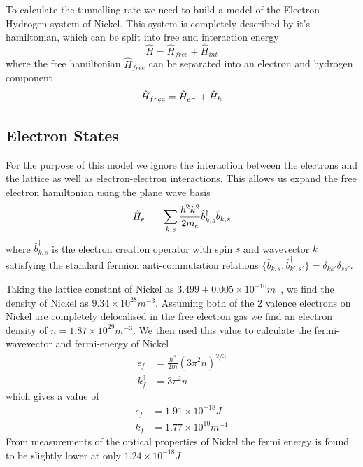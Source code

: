 To calculate the tunnelling rate we
need to build a model of the Electron-Hydrogen
system of Nickel. This system is completely
described by it's hamiltonian, which can be
split into free and interaction energy
\begin{equation}
  \hat{H} = \hat{H}_{free} + \hat{H}_{int}
\end{equation}
where the free hamiltonian \(\hat{H}_{free}\)
can be separated
into an electron and hydrogen component
\begin{equation}
  \hat{H}_{free} =
  \hat{H}_{e^-} + \hat{H}_{h}\\
\end{equation}



\subsection{Electron States}\label{sec:electron states}
For the purpose of this model we ignore the
interaction between the electrons
and the lattice as well as electron-electron
interactions. This allows
us expand the free electron
hamiltonian using the plane wave
basis
\begin{equation}
  \hat{H}_{e^-} = \sum_{k, s}
  \frac{\hbar^2 k^2}{2m_e} \hat{b}^\dagger_{k, s} \hat{b}_{k, s}\\
\end{equation}
where \(\hat{b}^\dagger_{k, s}\)
is the electron creation operator
with spin \(s\) and wavevector
\(k\) satisfying the standard
fermion anti-commutation relations
\( \{ \hat{b}_{k, s}, \hat{b}^\dagger_{k', s'} \}
= \delta_{k k'} \delta_{s s'}\).

Taking the lattice constant of Nickel as
\(3.499\pm{}0.005\times{}10^{-10}m\)~\cite{PhysRev.25.753},
we find the density of Nickel as
\(9.34\times{}10^{28}m^{-3}\).
Assuming both of the 2 valence
electrons on Nickel are completely
delocalised in
the free electron gas we
find an electron density of
\(n = 1.87\times{}10^{29} m^{-3}\).
We then used this value to calculate
the fermi-wavevector and fermi-energy of
Nickel~\cite{KittelCharles1953Itss}
\begin{align}
  \epsilon_f & = \frac{\hbar^2}{2m} {(3\pi^2n)}^{2/3} \\
  k_f^3      & = 3 \pi^2 n
\end{align}
which gives a value of
\begin{align}
  \epsilon_f & = 1.91\times{}10^{-18}J                                  \\
  k_f        & = 1.77\times{}10^{10}m^{-1} \label{eqn:fermi wavevector}
\end{align}
From measurements of the optical
properties of Nickel the
fermi energy is found to
be slightly lower
at only
\(1.24\times{} 10^{-18}J\)~\cite{PhysRev.131.2469}.

